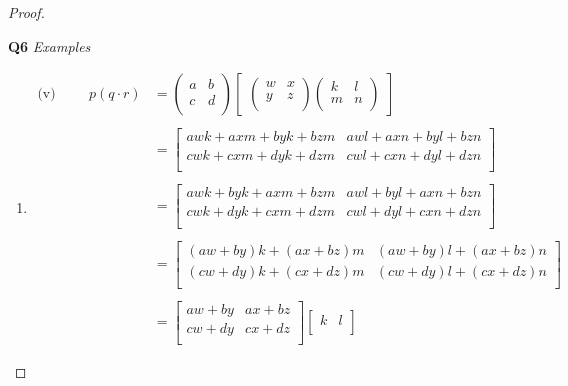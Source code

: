 \documentclass[11pt,a4paper]{article}
\theoremstyle{definition}
\begin{document}
\begin{proof}
\begin{enumerate}
\pagebreak
\textbf{Q6} \textit{Examples}
\begin{enumerate}
     \item[]
     \begin{align*}
  \text{(v)}\hspace{1cm}  p (q\cdot r) & = \begin{pmatrix}
  a & b\\
  c & d\\
  \end{pmatrix}\begin{bmatrix}
  \begin{pmatrix}
  w & x\\
  y & z\\
  \end{pmatrix}\begin{pmatrix}
  k & l\\
  m & n\\
  \end{pmatrix}
  \end{bmatrix}\\\\
  & = \begin{bmatrix}
  awk + axm + byk + bzm & awl + axn + byl + bzn\\
  cwk + cxm + dyk + dzm & cwl + cxn + dyl + dzn\\
  \end{bmatrix}\\\\
  & = \begin{bmatrix}
  awk + byk + axm + bzm & awl + byl + axn + bzn\\
  cwk + dyk + cxm + dzm & cwl + dyl + cxn + dzn\\
  \end{bmatrix}\\\\
   & = \begin{bmatrix}
   (aw + by)k + (ax + bz)m & (aw + by)l + (ax + bz)n\\
   (cw + dy)k + (cx + dz)m & (cw + dy)l + (cx + dz)n\\
   \end{bmatrix}\\\\
   & = \begin{bmatrix}
   aw + by & ax + bz\\
   cw + dy & cx + dz\\
   \end{bmatrix}\begin{bmatrix}
   k & l\\

\end{bmatrix}
\end{align*}
\end{enumerate}
\end{enumerate}
\end{proof}
\end{document}
